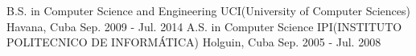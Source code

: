 

\begin{cventries}

  \cventry
    {B.S. in Computer Science and Engineering} %
    {UCI(University of Computer Sciences)} %
    {Havana, Cuba} %
    {Sep. 2009 - Jul. 2014} %
    {
    }
  \cventry
    {A.S. in Computer Science} %
    {IPI(INSTITUTO POLITECNICO DE INFORMÁTICA)} %
    {Holguin, Cuba} %
    {Sep. 2005 - Jul. 2008} %
    {
    }

\end{cventries}
